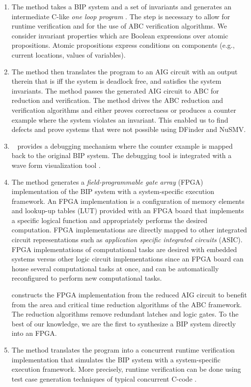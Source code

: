 \begin{enumerate}
\item The method takes a BIP system and a set of invariants and generates 
  an intermediate C-like {\em one loop program } \caig. 
  The \caig step is necessary to allow for runtime verification and for the use
  of ABC verification algorithms. We consider invariant properties which are Boolean expressions
over atomic propositions. Atomic propositions express conditions
on components (e.g., current locations, values of variables).

\item The method then translates the \caig program to 
  an AIG circuit with an output therein that is \true iff the system 
  is deadlock free, and satisfies the system invariants. 
  The method passes the generated AIG circuit to ABC for reduction and 
  verification. 
  The method drives the ABC reduction and verification algorithms and 
  either proves correctness or produces a counter example where the 
  system violates an invariant. 
  This enabled us to find defects and prove systems that were not 
  possible using DFinder and NuSMV. 

\item  \biptool~ provides a debugging mechanism where the 
  counter example is mapped back to the original BIP system. 
  The debugging tool is integrated with a wave form visualization tool 
  \cite{bybell2010gtkwave}.  
\item The method generates a {\em field-programmable gate array} (FPGA) 
  implementation of the BIP system with a 
  system-specific execution framework. 
  An FPGA implementation is a configuration of 
  memory elements and lookup-up tables (LUT) provided with an FPGA board
  that implements a specific logical function
  and appropriately performs the desired computation. 
  FPGA implementations are directly mapped to other integrated circuit representations
  such as {\em application specific integrated circuits} (ASIC). 
  FPGA implementations of computational tasks are desired with embedded 
  systems versus other logic circuit implementations 
  since an FPGA board can house several computational tasks at once,
  and can be automatically reconfigured to perform new computational tasks. 

  \biptool{} constructs the FPGA implementation from the reduced AIG circuit 
  to benefit from the area and critical time reduction algorithms 
  of the ABC framework. 
  The reduction algorithms remove redundant latches and logic gates.  
  To the best of our knowledge, we are the first to synthesize a BIP system directly 
  into an FPGA. 

\item The method translates the \caig program into a concurrent runtime verification 
  implementation that simulates the BIP 
  system with a system-specific execution framework. More precisely, runtime verification can be done using 
test case generation techniques of typical concurrent C-code \cite{kbse-BurnimS08}.
\end{enumerate}


